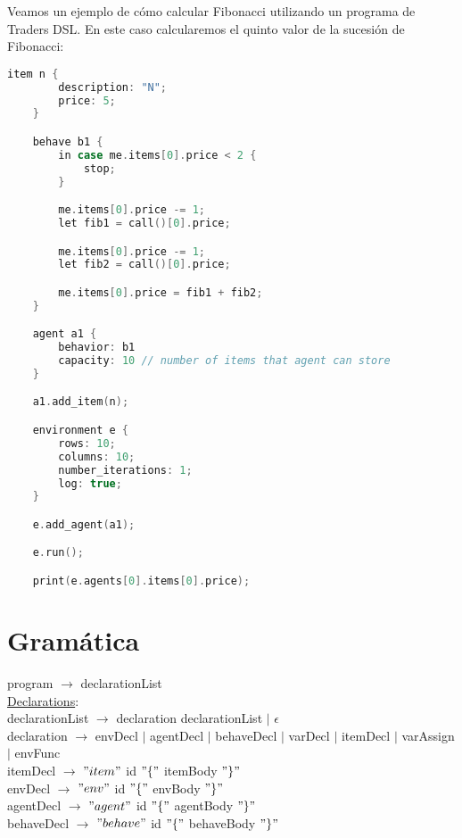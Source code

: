 \documentclass{article}
\begin{document}
Veamos un ejemplo de cómo calcular Fibonacci utilizando un programa de Traders DSL. En este caso calcularemos el quinto valor de la sucesión de Fibonacci:

\begin{lstlisting}[language=c]
	item n {
		description: "N";
		price: 5;
	}	

	behave b1 {
		in case me.items[0].price < 2 {
			stop;
		}

		me.items[0].price -= 1;
		let fib1 = call()[0].price;

		me.items[0].price -= 1;
		let fib2 = call()[0].price;

		me.items[0].price = fib1 + fib2;
	}

	agent a1 {
		behavior: b1
		capacity: 10 // number of items that agent can store
	}

	a1.add_item(n);

	environment e {
		rows: 10;
		columns: 10;
		number_iterations: 1;
		log: true;
	}

	e.add_agent(a1);

	e.run();

	print(e.agents[0].items[0].price);

\end{lstlisting}


\section{Gramática}

program $\rightarrow$ declarationList \\

\underline{Declarations}: \\

declarationList $\rightarrow$ declaration declarationList  $\vert$ $\epsilon$ \\

declaration $\rightarrow$ envDecl $\vert$ agentDecl $\vert$ behaveDecl $\vert$ varDecl $\vert$ itemDecl  $\vert$ varAssign $\vert$ envFunc\\

itemDecl $\rightarrow$ $"item"$ id $"\{"$ itemBody $"\}"$ \\

envDecl $\rightarrow$ $"env"$ id $"\{"$ envBody $"\}"$ \\

agentDecl $\rightarrow$ $"agent"$ id $"\{"$ agentBody $"\}"$ \\

behaveDecl $\rightarrow$ $"behave"$ id $"\{"$ behaveBody $"\}"$ \\
\end{document}

